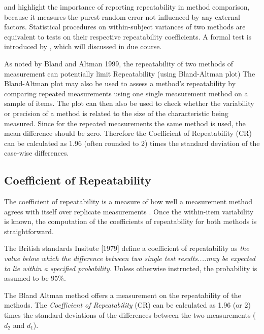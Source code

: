\documentclass[12pt, a4paper]{article}
\begin{document}
\citet{barnhart} and \citet{roy} highlight the importance of reporting repeatability in method comparison, because it measures the purest random error not influenced by any external factors. Statistical procedures on within-subject variances of two methods are equivalent to tests on their respective repeatability coefficients. A formal test is introduced by \citet{roy}, which will discussed in due course.

As noted by Bland and Altman 1999, the repeatability of two methods of measurement can  potentially limit
Repeatability (using Bland-Altman plot)
The Bland-Altman plot may also be used to assess a method’s repeatability by comparing repeated measurements using one single measurement method on a sample of items.
The plot can then also be used to check whether the variability or precision of a method is related to the size of the characteristic being measured.
Since for the repeated measurements the same method is used, the mean difference should be zero.
Therefore the Coefficient of Repeatability (CR) can be calculated as 1.96 (often rounded to 2) times the standard deviation of the case-wise differences.

\subsection{Coefficient of Repeatability}
The coefficient of repeatability is a measure of how well a
measurement method agrees with itself over replicate measurements
\citep{BA99}. Once the within-item variability is known, the
computation of the coefficients of repeatability for both methods
is straightforward.

The British standards Insitute [$1979$] define a coefficient of
repeatability  as \emph{the value below which the difference between two single test results....may be expected to lie within a specified probability.} Unless otherwise instructed, the
probability is assumed to be $95\%$. 

	The Bland Altman method offers a measurement on the repeatability of the methods. The \emph{Coefficient of Repeatability} (CR) can be calculated as 1.96 (or 2) times the standard deviations of the differences between the two measurements ($d_2$ and $d_1$).
\end{document}
